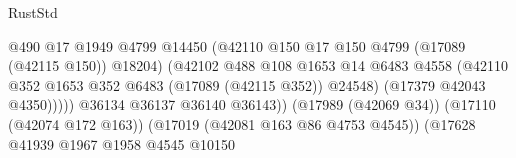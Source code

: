\begin{lexlean}{RustStd}
\begin{coremodule}
                                                          @490
                                                          @17
                                                          @1949
                                                          @4799
                                                          @14450
                                                          (@42110
                                                            @150
                                                            @17
                                                            @150
                                                            @4799
                                                            (@17089 (@42115 @150))
                                                            @18204)
                                                          (@42102
                                                            @488
                                                            @108
                                                            @1653
                                                            @14
                                                            @6483
                                                            @4558
                                                            (@42110
                                                              @352
                                                              @1653
                                                              @352
                                                              @6483
                                                              (@17089 (@42115 @352))
                                                              @24548)
                                                            (@17379 @42043 @4350)))))
                                                    @36134
                                                    @36137
                                                    @36140
                                                    @36143))
                                                (@17989 (@42069 @34))
                                                (@17110 (@42074 @172 @163))
                                                (@17019 (@42081 @163 @86 @4753 @4545))
                                                (@17628
                                                  @41939
                                                  @1967
                                                  @1958
                                                  @4545
                                                  @10150

\end{coremodule}
\end{lexlean}

